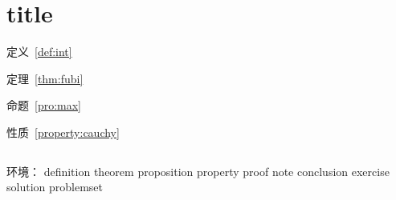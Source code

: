 \chapter{title}

\begin{introduction}
    \item 定义~\ref{def:int}
    \item 定理~\ref{thm:fubi}
    \item 命题~\ref{pro:max}
    \item 性质~\ref{property:cauchy}
\end{introduction}

\section{}

\subsection{}

\subsection{}



环境：
    definition
    theorem
    proposition
    property
    proof
    note
    conclusion
    exercise
    solution
    problemset
